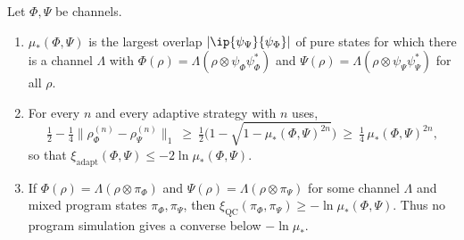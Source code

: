 \begin{theorem}\label{chn:thm:pureprog}
Let $\Phi,\Psi$ be channels.
\begin{enumerate}
\item[(a)] $\mu_*(\Phi,\Psi)$ is the largest overlap $|\ip{\psi_\Psi}{\psi_\Phi}|$ of pure states for which there is a channel $\Lambda$ with $\Phi(\rho)=\Lambda(\rho\otimes\psi_\Phi\psi_\Phi^*)$ and $\Psi(\rho)=\Lambda(\rho\otimes\psi_\Psi\psi_\Psi^*)$ for all $\rho$.
\item[(b)] For every $n$ and every adaptive strategy with $n$ uses,
\[
\tfrac12-\tfrac14\big\|\rho^{(n)}_\Phi-\rho^{(n)}_\Psi\big\|_1\ \ge\ \tfrac12\Big(1-\sqrt{1-\mu_*(\Phi,\Psi)^{2n}}\Big)\ \ge\ \tfrac14\,\mu_*(\Phi,\Psi)^{2n},
\]
so that $\xi_{\mathrm{adapt}}(\Phi,\Psi)\le-2\ln\mu_*(\Phi,\Psi)$.
\item[(c)] If $\Phi(\rho)=\Lambda(\rho\otimes\pi_\Phi)$ and $\Psi(\rho)=\Lambda(\rho\otimes\pi_\Psi)$ for some channel $\Lambda$ and mixed program states $\pi_\Phi,\pi_\Psi$, then $\xi_{\mathrm{QC}}(\pi_\Phi,\pi_\Psi)\ge-\ln\mu_*(\Phi,\Psi)$. Thus no program simulation gives a converse below $-\ln\mu_*$.
\end{enumerate}
\end{theorem}

